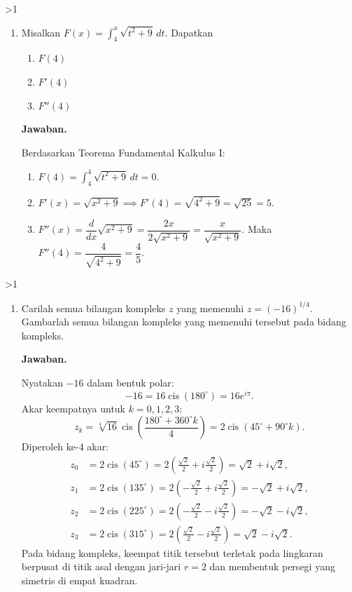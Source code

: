 \documentclass[12pt]{article}
\newcommand{\answername}{Jawaban}
\newenvironment{soaljawab}[1]{%
    \ifnum#1>1\clearpage\fi
    \begin{tcolorbox}[enhanced,breakable,height fill,height fixed for=all,
        sharp corners,colback=white,colframe=black,boxrule=0.4bp,
        boxsep=0pt,left=12bp,right=12bp,top=6bp,bottom=10bp,
        before skip=0pt,after skip=0pt,pad at break=8bp]
    \fontsize{12bp}{14bp}\selectfont
    \setlength{\abovedisplayskip}{8bp}
    \setlength{\belowdisplayskip}{8bp}
    \setlength{\abovedisplayshortskip}{8bp}
    \setlength{\belowdisplayshortskip}{8bp}
    \renewcommand{\arraystretch}{1.15}
    \begin{enumerate}[start=#1,topsep=0pt]
}{%
    \end{enumerate}
    \end{tcolorbox}
}
\newcommand{\jawaban}{\par\medskip\textbf{\answername.}\par\smallskip}
\begin{document}
\begin{soaljawab}{3}
\item Misalkan $\displaystyle F(x) = \int_{4}^{x} \sqrt{t^2 + 9} \, dt$. Dapatkan
        \begin{enumerate}
          \item $F(4)$
          \item $F'(4)$
          \item $F''(4)$
        \end{enumerate}
\jawaban
Berdasarkan Teorema Fundamental Kalkulus I:
        \begin{enumerate}
          \item $F(4) = \displaystyle\int_{4}^{4} \sqrt{t^2 + 9} \, dt = 0$.
          \item $F'(x) = \sqrt{x^2 + 9} \implies F'(4) = \sqrt{4^2 + 9} = \sqrt{25} = 5$.
          \item $F''(x) = \dfrac{d}{dx}\sqrt{x^2 + 9} = \dfrac{2x}{2\sqrt{x^2 + 9}} = \dfrac{x}{\sqrt{x^2 + 9}}$.
                Maka $F''(4) = \dfrac{4}{\sqrt{4^2 + 9}} = \dfrac{4}{5}$.
        \end{enumerate}
\end{soaljawab}

\begin{soaljawab}{4}
\item Carilah semua bilangan kompleks $z$ yang memenuhi $z = (-16)^{1/4}$. Gambarlah semua bilangan kompleks yang memenuhi tersebut pada bidang kompleks.
\jawaban
Nyatakan $-16$ dalam bentuk polar:
        \[
          -16 = 16 \operatorname{cis}(180^\circ) = 16 e^{i\pi}.
        \]
        Akar keempatnya untuk $k = 0, 1, 2, 3$:
        \[
          z_k = \sqrt[4]{16} \operatorname{cis}\left(\frac{180^\circ + 360^\circ k}{4}\right) = 2 \operatorname{cis}(45^\circ + 90^\circ k).
        \]
        Diperoleh ke-4 akar:
        \begin{align*}
          z_0 & = 2 \operatorname{cis}(45^\circ) = 2\left(\frac{\sqrt{2}}{2} + i\frac{\sqrt{2}}{2}\right) = \sqrt{2} + i\sqrt{2},    \\
          z_1 & = 2 \operatorname{cis}(135^\circ) = 2\left(-\frac{\sqrt{2}}{2} + i\frac{\sqrt{2}}{2}\right) = -\sqrt{2} + i\sqrt{2}, \\
          z_2 & = 2 \operatorname{cis}(225^\circ) = 2\left(-\frac{\sqrt{2}}{2} - i\frac{\sqrt{2}}{2}\right) = -\sqrt{2} - i\sqrt{2}, \\
          z_3 & = 2 \operatorname{cis}(315^\circ) = 2\left(\frac{\sqrt{2}}{2} - i\frac{\sqrt{2}}{2}\right) = \sqrt{2} - i\sqrt{2}.
        \end{align*}
        Pada bidang kompleks, keempat titik tersebut terletak pada lingkaran berpusat di titik asal dengan jari-jari $r = 2$ dan membentuk persegi yang simetris di empat kuadran.
\end{soaljawab}
\end{document}
